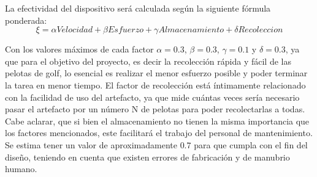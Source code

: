La efectividad del dispositivo será calculada según la siguiente fórmula ponderada:
\vspace{5mm}
\begin{equation}
  \xi =\alpha Velocidad + \beta  Esfuerzo + \gamma Almacenamiento + \delta Recoleccion
\end{equation}
\vspace{3mm}

Con los valores máximos de cada factor $\alpha=0.3$, $\beta=0.3$, $\gamma=0.1$ y $\delta=0.3$, ya que para el objetivo del proyecto, es decir la recolección rápida y fácil de las pelotas de golf, lo esencial es realizar el menor esfuerzo posible y poder terminar la tarea en menor tiempo. El factor de recolección está íntimamente relacionado con la facilidad de uso del artefacto, ya que mide cuántas veces sería necesario pasar el artefacto por un número N de pelotas para poder recolectarlas a todas. Cabe aclarar, que si bien el almacenamiento no tienen la misma importancia que los factores mencionados, este facilitará el trabajo del personal de mantenimiento. Se estima tener un valor  de aproximadamente $0.7$ para que cumpla con el fin del diseño, teniendo en cuenta que existen errores de fabricación y de manubrio humano.
